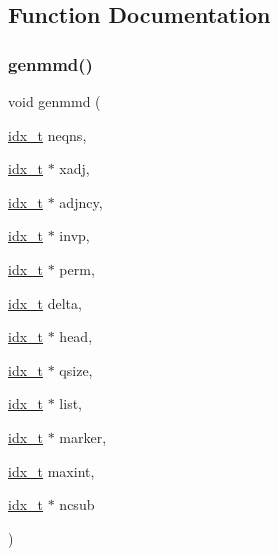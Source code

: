 \subsection{Function Documentation}
\mbox{\label{a00248_a1e95a23d02012fa27796f130010599dc}} 
\subsubsection{\texorpdfstring{genmmd()}{genmmd()}}
{\footnotesize\ttfamily void genmmd (\begin{DoxyParamCaption}\item[{\hyperlink{a00876_aaa5262be3e700770163401acb0150f52}{idx\+\_\+t}}]{neqns,  }\item[{\hyperlink{a00876_aaa5262be3e700770163401acb0150f52}{idx\+\_\+t} $\ast$}]{xadj,  }\item[{\hyperlink{a00876_aaa5262be3e700770163401acb0150f52}{idx\+\_\+t} $\ast$}]{adjncy,  }\item[{\hyperlink{a00876_aaa5262be3e700770163401acb0150f52}{idx\+\_\+t} $\ast$}]{invp,  }\item[{\hyperlink{a00876_aaa5262be3e700770163401acb0150f52}{idx\+\_\+t} $\ast$}]{perm,  }\item[{\hyperlink{a00876_aaa5262be3e700770163401acb0150f52}{idx\+\_\+t}}]{delta,  }\item[{\hyperlink{a00876_aaa5262be3e700770163401acb0150f52}{idx\+\_\+t} $\ast$}]{head,  }\item[{\hyperlink{a00876_aaa5262be3e700770163401acb0150f52}{idx\+\_\+t} $\ast$}]{qsize,  }\item[{\hyperlink{a00876_aaa5262be3e700770163401acb0150f52}{idx\+\_\+t} $\ast$}]{list,  }\item[{\hyperlink{a00876_aaa5262be3e700770163401acb0150f52}{idx\+\_\+t} $\ast$}]{marker,  }\item[{\hyperlink{a00876_aaa5262be3e700770163401acb0150f52}{idx\+\_\+t}}]{maxint,  }\item[{\hyperlink{a00876_aaa5262be3e700770163401acb0150f52}{idx\+\_\+t} $\ast$}]{ncsub }\end{DoxyParamCaption})}

